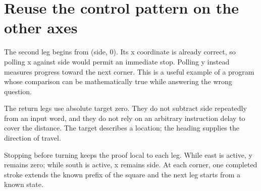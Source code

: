 \section{Reuse the control pattern on the other
  axes}\label{006-marsbot-square-p08-reuse-the-control-pattern-on-the-other-axes}

The second leg begins from (side, 0). Its x coordinate is already
correct, so polling x against side would permit an immediate stop.
Polling y instead measures progress toward the next corner. This is a
useful example of a program whose comparison can be mathematically true
while answering the wrong question.

The return legs use absolute target zero. They do not subtract side
repeatedly from an input word, and they do not rely on an arbitrary
instruction delay to cover the distance. The target describes a
location; the heading supplies the direction of travel.

Stopping before turning keeps the proof local to each leg. While east is
active, y remains zero; while south is active, x remains side. At each
corner, one completed stroke extends the known prefix of the square and
the next leg starts from a known state.

